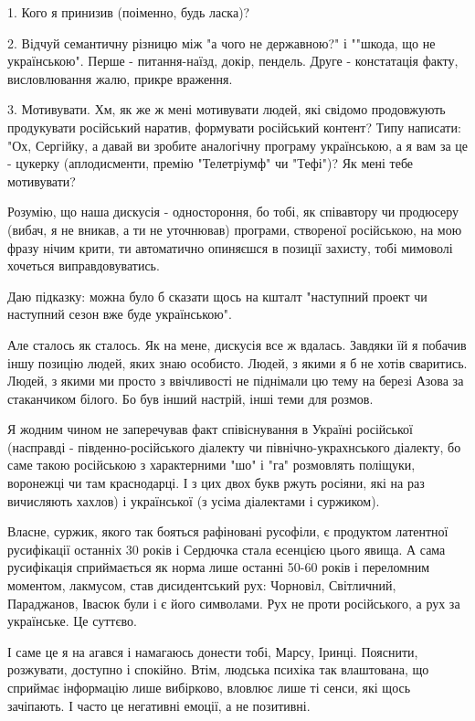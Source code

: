 \begin{itemize}
\begin{itemize}
1. Кого я принизив (поіменно, будь ласка)?

2. Відчуй семантичну різницю між "а чого не державною?" і ""шкода, що не
українською". Перше - питання-наїзд, докір, пендель. Друге - констатація факту,
висловлювання жалю, прикре враження.

3. Мотивувати. Хм, як же ж мені мотивувати людей, які свідомо продовжують
продукувати російський наратив, формувати російський контент? Типу написати:
"Ох, Сергійку, а давай ви зробите аналогічну програму українською, а я вам за
це - цукерку (аплодисменти, премію "Телетріумф" чи "Тефі")? Як мені тебе
мотивувати?

Розумію, що наша дискусія - одностороння, бо тобі, як співавтору чи продюсеру
(вибач, я не вникав, а ти не уточнював) програми, створеної російською, на мою
фразу нічим крити, ти автоматично опиняєшся в позиції захисту, тобі мимоволі
хочеться виправдовуватись.

Даю підказку: можна було б сказати щось на кшталт "наступний проект чи
наступний сезон вже буде українською".

Але сталось як сталось. Як на мене, дискусія все ж вдалась. Завдяки їй я
побачив іншу позицію людей, яких знаю особисто. Людей, з якими я б не хотів
сваритись. Людей, з якими ми просто з ввічливості не піднімали цю тему на
березі Азова за стаканчиком білого. Бо був інший настрій, інші теми для розмов.

Я жодним чином не заперечував факт співіснування в Україні російської
(насправді - південно-російського діалекту чи північно-украхнського діалекту,
бо саме такою російською з характерними "шо" і "га" розмовлять поліщуки,
воронежці чи там краснодарці. І з цих двох букв ржуть росіяни, які на раз
вичисляють хахлов) і української (з усіма діалектами і суржиком).

Власне, суржик, якого так бояться рафіновані русофіли, є продуктом латентної
русифікації останніх 30 років і Сердючка стала есенцією цього явища. А сама
русифікація сприймається як норма лише останні 50-60 років і переломним
моментом, лакмусом, став дисидентський рух: Чорновіл, Світличний, Параджанов,
Івасюк були і є його символами. Рух не проти російського, а рух за українське.
Це суттєво.

І саме це я на агався і намагаюсь донести тобі, Марсу, Іринці. Пояснити,
розжувати, доступно і спокійно. Втім, людська психіка так влаштована, що
сприймає інформацію лише вибірково, вловлює лише ті сенси, які щось зачіпають.
І часто це негативні емоції, а не позитивні.


\end{itemize}
\end{itemize}
